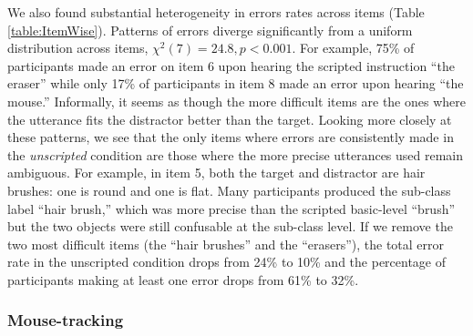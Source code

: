 \documentclass[manuscript]{stjour}
\begin{document}
We also found substantial heterogeneity in errors rates across items (Table \ref{table:ItemWise}). Patterns of errors diverge significantly from a uniform distribution across items, $\chi^2(7) = 24.8, p < 0.001$.
For example, 75\% of participants made an error on item 6 upon hearing the scripted instruction ``the eraser'' while only 17\% of participants in item 8 made an error upon hearing ``the mouse.'' Informally, it seems as though the more difficult items are the ones where the utterance fits the distractor better than the target.  Looking more closely at these patterns, we see that the only items where errors are consistently made in the \emph{unscripted} condition are those where the more precise utterances used remain ambiguous. For example, in item 5, both the target and distractor are hair brushes: one is round and one is flat. Many participants produced the sub-class label ``hair brush,'' which was more precise than the scripted basic-level ``brush'' but the two objects were still confusable at the sub-class level. If we remove the two most difficult items (the ``hair brushes'' and the ``erasers''), the total error rate in the unscripted condition drops from 24\% to 10\% and the percentage of participants making at least one error drops from 61\% to 32\%.


\subsubsection{Mouse-tracking}
\end{document}
